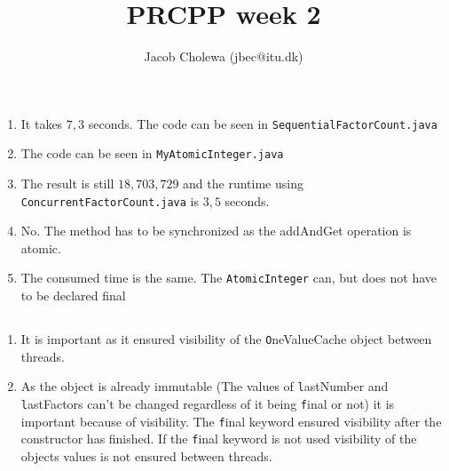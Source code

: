 \documentclass{tufte-handout}
\title{PRCPP week 2}
\author{Jacob Cholewa (jbec@itu.dk)}
\begin{document}
  \maketitle

  \section{}

  
  \subsection{}

  \begin{enumerate}
    \item It takes $7,3$ seconds. The code can be seen in \texttt{SequentialFactorCount.java}
    \item The code can be seen in \texttt{MyAtomicInteger.java}
    \item The result is still $18,703,729$ and the runtime using \texttt{ConcurrentFactorCount.java} is $3,5$ seconds.
    \item No. The method has to be synchronized as the addAndGet operation is atomic.
    \item The consumed time is the same. The \texttt{AtomicInteger} can, but does not have to be declared final

  \end{enumerate}

  \subsection{}

  \begin{enumerate}
    \item It is important as it ensured visibility of the \texttt OneValueCache object between threads.
    \item As the object is already immutable (The values of \texttt lastNumber and \texttt lastFactors can't be changed regardless of it being \texttt final or not) it is important because of visibility. The \texttt final keyword ensured visibility after the constructor has finished. If the \texttt final keyword is not used visibility of the objects values is not ensured between threads.
  \end{enumerate}

  \subsection{}
\end{document}
